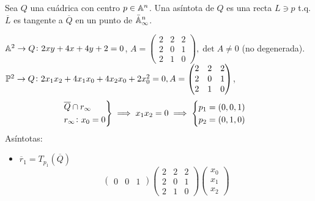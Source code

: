 \begin{defi}
    Sea $Q$ una cuádrica con centro $p\in\mathbb{A}^n$. Una asíntota de $Q$ es una recta $L \ni p$ t.q. $\overline{L}$ es tangente a $\overline{Q}$ en un punto de $\bar{\mathbb{A}}_\infty^n$.
\end{defi}
\begin{example}
    $\mathbb{A}^2 \to Q \colon 2xy + 4x +4y +2 = 0$,
    $A = \left( \begin{array}{c|cc}
        2 & 2 & 2 \\ \hline
        2 & 0 & 1 \\
        2 & 1 & 0
    \end{array} \right), \det A \neq 0$ (no degenerada). \\
    $\mathbb{P}^2 \to Q \colon 2x_1x_2 + 4x_1x_0 + 4x_2x_0 + 2x_0^2 = 0,
    A = \begin{pmatrix}
        2 & 2 & 2 \\
        2 & 0 & 1 \\
        2 & 1 & 0
    \end{pmatrix}$,
    \begin{gather*}
        \begin{rcases}
            \overline{Q} \cap r_\infty \\
            r_\infty \colon x_0 = 0
        \end{rcases}
        \implies x_1x_2 = 0 \implies
        \begin{cases}
            p_1 = \left( 0,0,1 \right) \\
            p_2 = \left( 0,1,0 \right)
        \end{cases}
    \end{gather*}
    Asíntotas:
    \begin{itemize}
        \item $\overline{r}_1 = T_{p_1}\left( \overline{Q} \right)$
            \[
                \begin{pmatrix}
                    0 & 0 & 1
                \end{pmatrix}
                \begin{pmatrix}
                    2 & 2 & 2 \\
                    2 & 0 & 1 \\
                    2 & 1 & 0
                \end{pmatrix}
                \begin{pmatrix}
                    x_0 \\ x_1 \\ x_2
                \end{pmatrix}
\]
\end{itemize}
\end{example}

